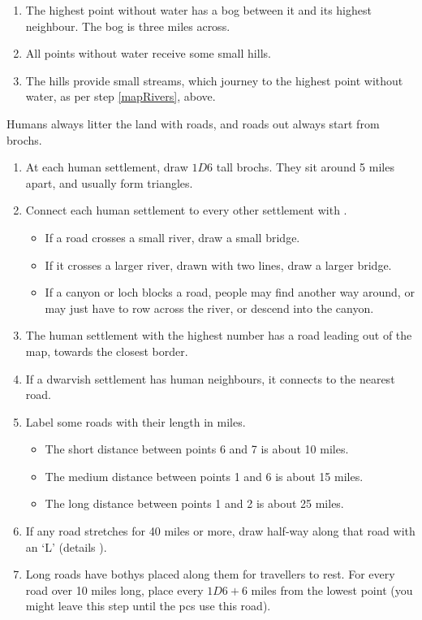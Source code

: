 \begin{multicols}{2}
\begin{enumerate}
  \item
  The highest point without water has a bog between it and its highest neighbour.
  The bog is three miles across.
  \item
  All points without water receive some small hills.
  \item
  The hills provide small streams, which journey to the highest point without water, as per step \ref{mapRivers}, above.
\end{enumerate}

\label{drawRoads}

Humans always litter the land with roads, and roads out always start from \glspl{broch}.

\begin{enumerate}
  \item
  At each human settlement, draw $1D6$ tall \glspl{broch}.
  They sit around 5 miles apart, and usually form triangles.
  \item
  Connect each human settlement to every other settlement with .
  \begin{itemize}
    \item
    If a road crosses a small river, draw a small bridge.
    \item
    If it crosses a larger river, drawn with two lines, draw a larger bridge.
    \item
    If a canyon or loch blocks a road, people may find another way around, or may just have to row across the river, or descend into the canyon.
  \end{itemize}
  \item
  The human settlement with the highest number has a road leading out of the map, towards the closest border.
  \label{roadOut}
  \item
  If a dwarvish settlement has human neighbours, it connects to the nearest road.
  \item
  Label some roads with their length in miles.
  \begin{itemize}
    \item
    The short distance between points 6 and 7 is about 10 miles.
    \item
    The medium distance between points 1 and 6 is about 15 miles.
    \item
    The long distance between points 1 and 2 is about 25 miles.
  \end{itemize}
  \item
  If any road stretches for 40 miles or more, draw  half-way along that road with an `L' (details ).
  \item
  Long roads have \glspl{bothy} placed along them for travellers to rest.
  \label{bothyRolls}
  For every road over 10 miles long, place  every $1D6+6$ miles from the lowest point
  (you might leave this step until the \glspl{pc} use this road).
\end{enumerate}


\end{multicols}
